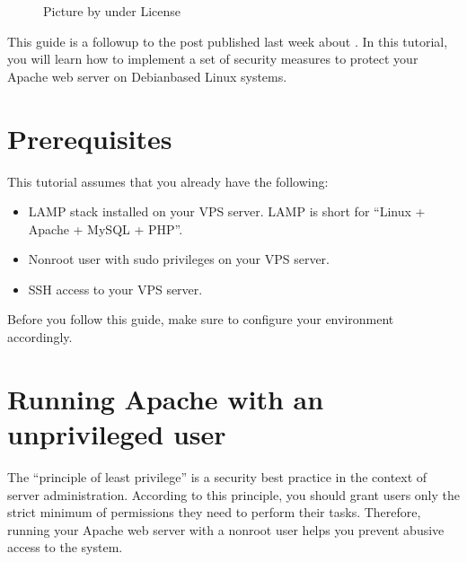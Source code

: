 \documentclass[a4paper,10pt,english,openany,oneside]{sphinxmanual}
\begin{document}
\begin{figure}[H]
\centering
\capstart

\noindent{}
\caption{Picture by \sphinxfootnotemark[15] under \sphinxfootnotemark[16] License}\label{\detokenize{hardening-apache:id1}}\end{figure}
%
\begin{footnotetext}[15]\label{\thesphinxscope.15}%
\sphinxAtStartFootnote
{}
%
\end{footnotetext}\ignorespaces %
\begin{footnotetext}[16]\label{\thesphinxscope.16}%
\sphinxAtStartFootnote
{}
%
\end{footnotetext}\ignorespaces 
\sphinxAtStartPar
This guide is a follow\sphinxhyphen{}up to the post published last week about {\hyperref[\detokenize{joomla-to-vps::doc}]{}}. In this tutorial, you will learn how to implement a set of security measures to protect your Apache web server on Debian\sphinxhyphen{}based Linux systems.


\section{Prerequisites}
\label{\detokenize{hardening-apache:prerequisites}}
\sphinxAtStartPar
This tutorial assumes that you already have the following:
\begin{itemize}
\item {} 
\sphinxAtStartPar
LAMP stack installed on your VPS server. LAMP is short for “Linux + Apache + MySQL + PHP”.

\item {} 
\sphinxAtStartPar
Non\sphinxhyphen{}root user with sudo privileges on your VPS server.

\item {} 
\sphinxAtStartPar
SSH access to your VPS server.

\end{itemize}

\sphinxAtStartPar
Before you follow this guide, make sure to configure your environment accordingly.


\section{Running Apache with an unprivileged user}
\label{\detokenize{hardening-apache:running-apache-with-an-unprivileged-user}}
\sphinxAtStartPar
The “principle of least privilege” is a security best practice in the context of server administration. According to this principle, you should grant users only the strict minimum of permissions they need to perform their tasks. Therefore, running your Apache web server with a non\sphinxhyphen{}root user helps you prevent abusive access to the system.
\end{document}
